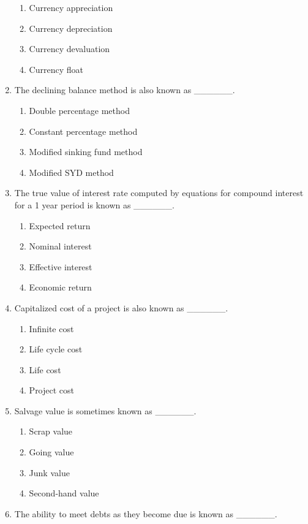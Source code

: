 \documentclass[11pt,a4paper]{article}
\begin{document}
\begin{enumerate}
{}
\begin{enumerate}[label=\Alph*.]
\item{Currency appreciation}
\item{Currency depreciation}
\item{Currency devaluation}
\item{Currency float}
\end{enumerate}
\item{The declining balance method is also known as \_\_\_\_\_\_.}
\begin{enumerate}[label=\Alph*.]
\item{Double percentage method}
\item{Constant percentage method}
\item{Modified sinking fund method}
\item{Modified SYD method}
\end{enumerate}
\item{The true value of interest rate computed by equations for compound interest for a 1 year period is known as \_\_\_\_\_\_.}
\begin{enumerate}[label=\Alph*.]
\item{Expected return}
\item{Nominal interest}
\item{Effective interest}
\item{Economic return}
\end{enumerate}
\item{Capitalized cost of a project is also known as \_\_\_\_\_\_.}
\begin{enumerate}[label=\Alph*.]
\item{Infinite cost}
\item{Life cycle cost}
\item{Life cost}
\item{Project cost}
\end{enumerate}
\item{Salvage value is sometimes known as \_\_\_\_\_\_.}
\begin{enumerate}[label=\Alph*.]
\item{Scrap value}
\item{Going value}
\item{Junk value}
\item{Second-hand value}
\end{enumerate}
\item{The ability to meet debts as they become due is known as \_\_\_\_\_\_.}
\\\begin{enumerate*}[itemjoin=\qquad, label=\Alph*.]

\end{enumerate*}
\end{enumerate}
\end{document}
